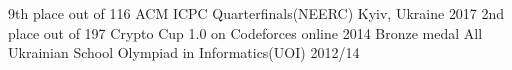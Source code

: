 






\begin{cvhonors}
  \cvhonor
    {9th place out of 116}
    {ACM ICPC Quarterfinals(NEERC)}
    {Kyiv, Ukraine}
    {2017}
  \cvhonor
    {2nd place out of 197}
    {Crypto Cup 1.0 on Codeforces}
    {online}
    {2014}
  \cvhonor
    {Bronze medal}
    {All Ukrainian School Olympiad in Informatics(UOI)}
    {}
    {2012/14}
\end{cvhonors}


